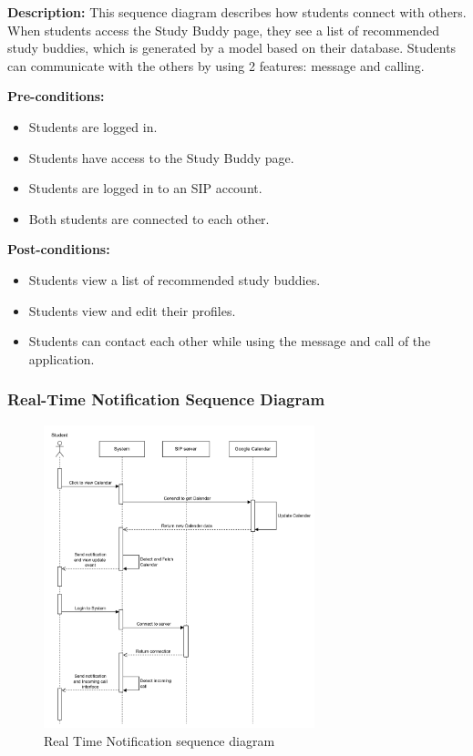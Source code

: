     \textbf{Description:} This sequence diagram describes how students connect with others. 
    When students access the Study Buddy page, they see a list of recommended study buddies, which is generated by a model based on their database. 
    Students can communicate with the others by using 2 features: message and calling.

    \noindent \textbf{Pre-conditions:} 
        \begin{itemize}
            \item Students are logged in.
            \item Students have access to the Study Buddy page.
            \item Students are logged in to an SIP account.
            \item Both students are connected to each other.
        \end{itemize}
    \noindent \textbf{Post-conditions:}
    \begin{itemize}
        \item Students view a list of recommended study buddies.
        \item Students view and edit their profiles.
        \item Students can contact each other while using the message and call of the application.
    \end{itemize}

\subsubsection{Real-Time Notification Sequence Diagram}
    \begin{figure}[H]
        \centering
        \includegraphics[width=0.7\textwidth, height=0.6\textheight]{image/Real-timeNotificationSequence.png} 
        \caption{Real Time Notification sequence diagram}
        \label{fig:noti_sequence}
    \end{figure}

